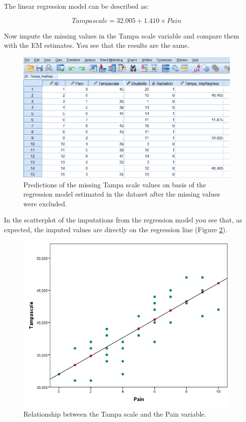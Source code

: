 \documentclass[]{book}
\begin{document}
The linear regression model can be described as:

\[Tampascale = 32.005 + 1.410 × Pain\]

Now impute the missing values in the Tampa scale variable and compare
them with the EM estimates. You see that the results are the same.

\begin{figure}

{\centering \includegraphics[width=0.7\linewidth]{images/fig3.15} 

}

\caption{Predictions of the missing Tampa scale values on basis of the regression model estimated in the dataset after the missing values were excluded.}\label{fig:fig3-15}
\end{figure}

In the scatterplot of the imputations from the regression model you see
that, as expected, the imputed values are directly on the regression
line (Figure \ref{fig:fig3-16}).

\begin{figure}

{\centering \includegraphics[width=0.7\linewidth]{images/fig3.16} 

}

\caption{Relationship between the Tampa scale and the Pain variable.}\label{fig:fig3-16}
\end{figure}
\end{document}
